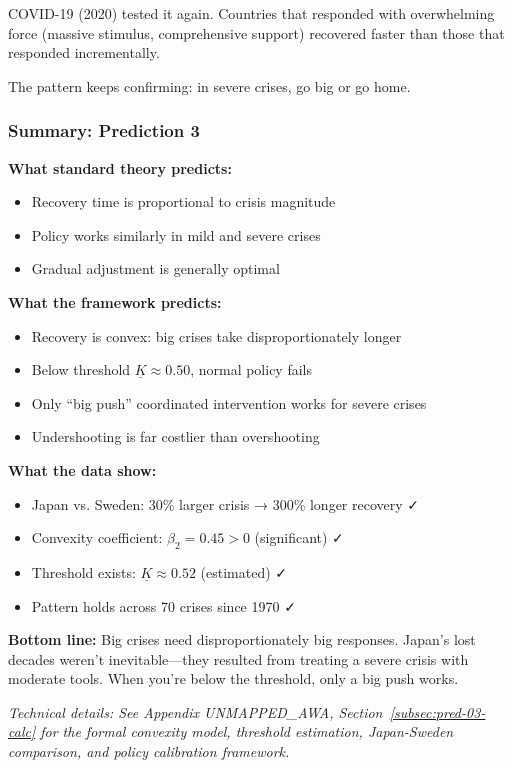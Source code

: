 COVID-19 (2020) tested it again. Countries that responded with overwhelming 
force (massive stimulus, comprehensive support) recovered faster than those 
that responded incrementally.

The pattern keeps confirming: in severe crises, go big or go home.

\subsubsection{Summary: Prediction 3}

\begin{tcolorbox}[colback=gray!5!white, colframe=gray!75!black, title=Prediction 3: Asymmetric Recovery]
\textbf{What standard theory predicts:}
\begin{itemize}
    \item Recovery time is proportional to crisis magnitude
    \item Policy works similarly in mild and severe crises
    \item Gradual adjustment is generally optimal
\end{itemize}

\textbf{What the framework predicts:}
\begin{itemize}
    \item Recovery is convex: big crises take disproportionately longer
    \item Below threshold $\underline{K} \approx 0.50$, normal policy fails
    \item Only ``big push'' coordinated intervention works for severe crises
    \item Undershooting is far costlier than overshooting
\end{itemize}

\textbf{What the data show:}
\begin{itemize}
    \item Japan vs. Sweden: 30\% larger crisis → 300\% longer recovery ✓
    \item Convexity coefficient: $\beta_2 = 0.45 > 0$ (significant) ✓
    \item Threshold exists: $\underline{K} \approx 0.52$ (estimated) ✓
    \item Pattern holds across 70 crises since 1970 ✓
\end{itemize}

\textbf{Bottom line:} Big crises need disproportionately big responses. 
Japan's lost decades weren't inevitable---they resulted from treating a 
severe crisis with moderate tools. When you're below the threshold, 
only a big push works.
\end{tcolorbox}

\vspace{0.5em}
\noindent\textit{Technical details: See Appendix UNMAPPED_AWA, Section~\ref{subsec:pred-03-calc} for the 
formal convexity model, threshold estimation, Japan-Sweden comparison, and 
policy calibration framework.}

